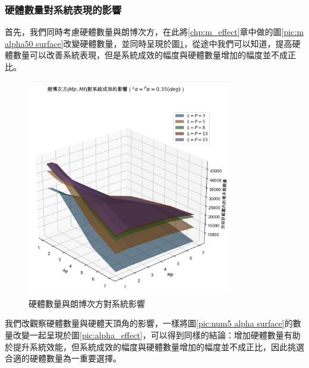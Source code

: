 

\newpage


\subsubsection{硬體數量對系統表現的影響}
\label{chp:amount_effect}

首先，我們同時考慮硬體數量與朗博次方，在此將\ref{chp:m_effect}章中做的圖\ref{pic:m alpha50 surface}改變硬體數量，並同時呈現於圖\ref{pic:m_effect}，從途中我們可以知道，提高硬體數量可以改善系統表現，但是系統成效的幅度與硬體數量增加的幅度並不成正比。

\begin{figure}[htpb]
    \centering
    \includegraphics[width=9cm]{ch4pic/m_effect.png}
    \caption{硬體數量與朗博次方對系統影響}
    \label{pic:m_effect}
\end{figure}

我們改觀察硬體數量與硬體天頂角的影響，一樣將圖\ref{pic:num5 alpha surface}的數量改變一起呈現於圖\ref{pic:alpha_effect}，可以得到同樣的結論：增加硬體數量有助於提升系統效能，但系統成效的幅度與硬體數量增加的幅度並不成正比，因此挑選合適的硬體數量為一重要選擇。

